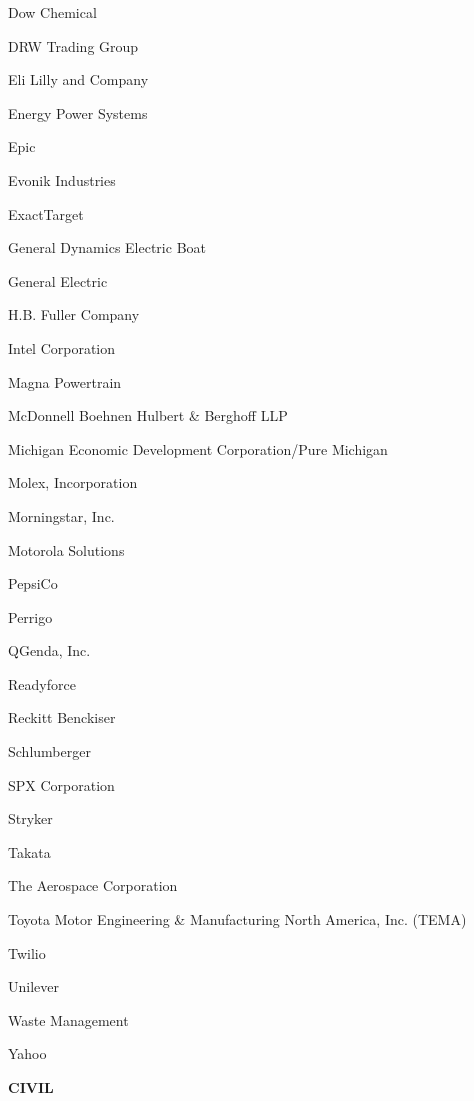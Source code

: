 \documentclass[twoside]{article}
\begin{document}
\begin{center}
\begin{multicols}{5}
\begin{FlushLeft}
\begin{compactitem}
\item Dow Chemical
\item DRW Trading Group
\item Eli Lilly and Company
\item Energy Power Systems
\item Epic
\item Evonik Industries
\item ExactTarget
\item General Dynamics Electric Boat
\item General Electric
\item H.B. Fuller Company
\item Intel Corporation
\item Magna Powertrain
\item McDonnell Boehnen Hulbert \& Berghoff LLP
\item Michigan Economic Development Corporation/Pure Michigan
\item Molex, Incorporation
\item Morningstar, Inc.
\item Motorola Solutions
\item PepsiCo
\item Perrigo
\item QGenda, Inc.
\item Readyforce
\item Reckitt Benckiser
\item Schlumberger
\item SPX Corporation
\item Stryker
\item Takata
\item The Aerospace Corporation
\item Toyota Motor Engineering \& Manufacturing North America, Inc. (TEMA)
\item Twilio
\item Unilever
\item Waste Management
\item Yahoo
\end{compactitem}
        \end{FlushLeft}
        \vspace{1em}
        {\fontsize{14}{16}\selectfont \bf CIVIL}\\
        \vspace{-1em}
        ~\hrulefill~
        \vspace{-.9em}
        \begin{FlushLeft}
        \begin{compactitem}

\end{compactitem}
\end{FlushLeft}
\end{multicols}
\end{center}
\end{document}
